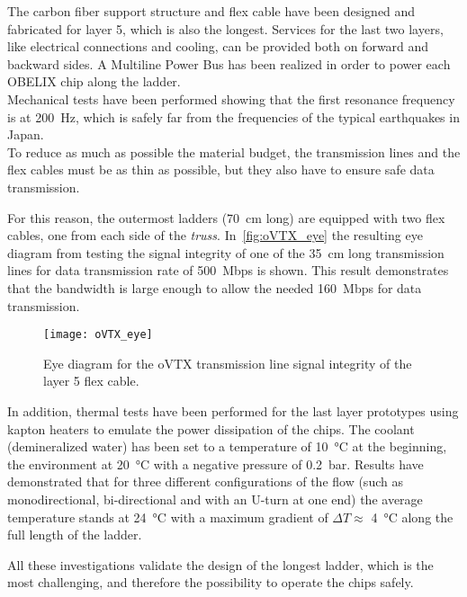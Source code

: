 The carbon fiber support structure and flex cable have been designed and fabricated for layer 5, which is also the longest. Services for the last two layers, like electrical connections and cooling, can be provided both on forward and backward sides.
A Multiline Power Bus has been realized in order to power each OBELIX chip along the ladder. \\

Mechanical tests have been performed showing that the first resonance frequency is at \SI{200}{Hz}, which is safely far from the frequencies of the typical earthquakes in Japan.\\

To reduce as much as possible the material budget, the transmission lines and the flex cables must be as thin as possible, but they also have to ensure safe data transmission.

For this reason, the outermost ladders (\SI{70}{cm} long) are equipped with two flex cables, one from each side of the \textit{truss}. In~\autoref{fig:oVTX_eye} the resulting eye diagram from testing the signal integrity of one of the \SI{35}{cm} long transmission lines for data transmission rate of \SI{500}{Mbps} is shown. This result demonstrates that the bandwidth is large enough to allow the needed \SI{160}{Mbps} for data transmission.


\begin{figure}[h!]
\centering
\texttt{[image: oVTX\_eye]}
\caption{Eye diagram for the oVTX transmission line signal integrity of the layer 5 flex cable.}
\label{fig:oVTX_eye}
\end{figure}


In addition, thermal tests have been performed for the last layer prototypes using kapton heaters to emulate the power dissipation of the chips. The coolant (demineralized water) has been set to a temperature of \SI{10}{\degreeCelsius} at the beginning, the environment at \SI{20}{\degreeCelsius} with a negative pressure of \SI{0.2}{bar}. Results have demonstrated that for three different configurations of the flow (such as monodirectional, bi-directional and with an U-turn at one end) the average temperature stands at \SI{24}{\degreeCelsius} with a maximum gradient of $\Delta T \approx$ \SI{4}{\degreeCelsius} along the full length of the ladder. 

All these investigations validate the design of the longest ladder, which is the most challenging, and therefore the possibility to operate the chips safely.


